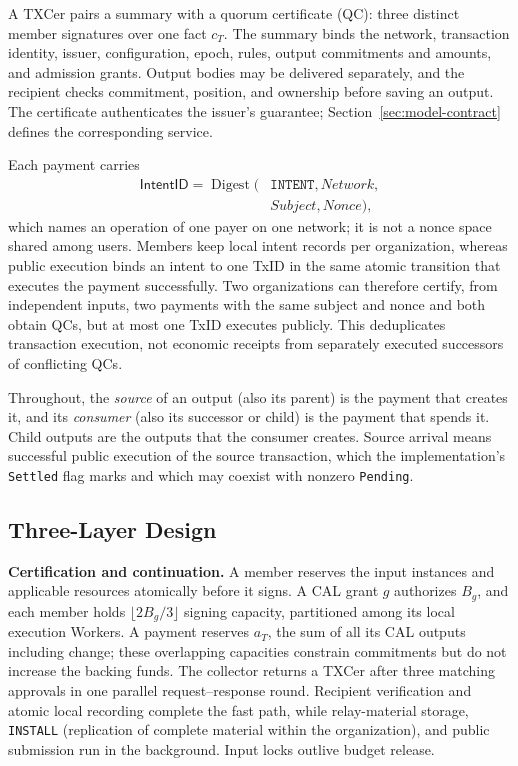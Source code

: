 A TXCer pairs a summary with a quorum certificate (QC): three distinct member signatures over one fact $c_T$. The summary binds the network, transaction identity, issuer, configuration, epoch, rules, output commitments and amounts, and admission grants. Output bodies may be delivered separately, and the recipient checks commitment, position, and ownership before saving an output. The certificate authenticates the issuer's guarantee; Section~\ref{sec:model-contract} defines the corresponding service.

Each payment carries
\[\begin{aligned}
\mathsf{IntentID}=\operatorname{Digest}(&\texttt{INTENT},\mathit{Network},\\
&\mathit{Subject},\mathit{Nonce}),
\end{aligned}\]
which names an operation of one payer on one network; it is not a nonce space shared among users. Members keep local intent records per organization, whereas public execution binds an intent to one TxID in the same atomic transition that executes the payment successfully. Two organizations can therefore certify, from independent inputs, two payments with the same subject and nonce and both obtain QCs, but at most one TxID executes publicly. This deduplicates transaction execution, not economic receipts from separately executed successors of conflicting QCs.

Throughout, the \emph{source} of an output (also its parent) is the payment that creates it, and its \emph{consumer} (also its successor or child) is the payment that spends it. Child outputs are the outputs that the consumer creates. Source arrival means successful public execution of the source transaction, which the implementation's \texttt{Settled} flag marks and which may coexist with nonzero \texttt{Pending}.

\subsection{Three-Layer Design}
\label{sec:model-layers}
\noindent\textbf{Certification and continuation.}
A member reserves the input instances and applicable resources atomically before it signs. A CAL grant $g$ authorizes $B_g$, and each member holds $\lfloor2B_g/3\rfloor$ signing capacity, partitioned among its local execution Workers. A payment reserves $a_T$, the sum of all its CAL outputs including change; these overlapping capacities constrain commitments but do not increase the backing funds. The collector returns a TXCer after three matching approvals in one parallel request--response round. Recipient verification and atomic local recording complete the fast path, while relay-material storage, \texttt{INSTALL} (replication of complete material within the organization), and public submission run in the background. Input locks outlive budget release.


